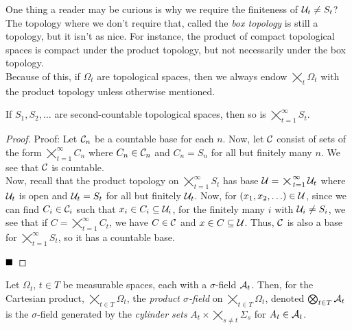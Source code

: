 One thing a reader may be curious is why we require the finiteness of $\cal{U}_{t} \ne S_{t}$? The topology where we don't require that, called the \emph{box topology} is still a topology, but it isn't as nice. For instance, the product of compact topological spaces is compact under the product topology, but not necessarily under the box topology.\\

Because of this, if $\Omega_{t}$ are topological spaces, then we always endow $\bigtimes_{t} \Omega_{t}$ with the product topology unless otherwise mentioned. 

\begin{lemma}
    If $S_1, S_2, \ldots$ are second-countable topological spaces, then so is $\bigtimes_{t = 1}^{\infty} S_{t}$. 
\end{lemma}
\begin{proof}{Proof:}
    Let $\cal{C}_{n}$ be a countable base for each $n$. Now, let $\cal{C}$ consist of sets of the form $\bigtimes_{t = 1}^{\infty} C_n$ where $C_n \in \cal{C}_n$ and $C_n = S_n$ for all but finitely many $n$. We see that $\cal{C}$ is countable.\\

    Now, recall that the product topology on $\bigtimes_{t = 1}^{\infty} S_{t}$ has base $\cal{U} = \bigtimes_{t = 1}^{\infty} \cal{U}_t$ where $\cal{U}_{t}$ is open and $\cal{U}_{t} = S_{t}$ for all but finitely $\cal{U}_{t}$. Now, for $(x_1, x_2, \ldots) \in \cal{U}$, since we can find $C_i \in \cal{C}_i$ such that $x_i \in C_i \subseteq \cal{U}_i$, for the finitely many $i$ with $\cal{U}_i \ne S_{i}$, we see that if $C = \bigtimes_{t = 1}^{\infty} C_{t}$, we have $C \in \cal{C}$ and $x \in C \subseteq \cal{U}$. Thus, $\cal{C}$ is also a base for $\bigtimes_{t = 1}^{\infty} S_{t}$, so it has a countable base.

    $\qed$
\end{proof}

\begin{definition}
    Let $\Omega_{t}$, $t \in T$ be measurable spaces, each with a $\sigma$-field $\cal{A}_{t}$. Then, for the Cartesian product, $\bigtimes_{t \in T} \Omega_{t}$, the \emph{product $\sigma$-field} on $\bigtimes_{t \in T} \Omega_{t}$, denoted $\bigotimes_{t \in T} \cal{A}_{t}$ is the $\sigma$-field generated by the \emph{cylinder sets} $A_{t} \times \bigtimes_{s \ne t} \Sigma_{s}$ for $A_{t} \in \cal{A}_{t}$. 
\end{definition}
\pagebreak

